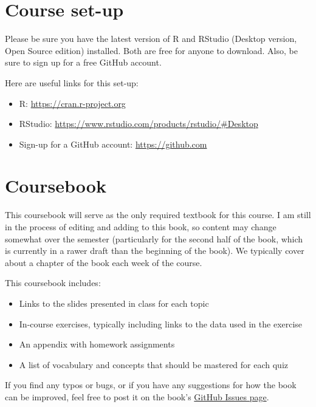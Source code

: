 \documentclass[]{book}
\providecommand{\tightlist}{%
  \setlength{\itemsep}{0pt}\setlength{\parskip}{0pt}}
\begin{document}
\hypertarget{course-set-up}{%
\section{Course set-up}\label{course-set-up}}

Please be sure you have the latest version of R and RStudio (Desktop version, Open Source edition) installed. Both are free for anyone to download. Also, be sure to sign up for a free GitHub account.

Here are useful links for this set-up:

\begin{itemize}
\tightlist
\item
  R: \url{https://cran.r-project.org}
\item
  RStudio: \url{https://www.rstudio.com/products/rstudio/\#Desktop}
\item
  Sign-up for a GitHub account: \url{https://github.com}
\end{itemize}

\hypertarget{coursebook}{%
\section{Coursebook}\label{coursebook}}

This coursebook will serve as the only required textbook for this course. I am still in the process of editing and adding to this book, so content may change somewhat over the semester (particularly for the second half of the book, which is currently in a rawer draft than the beginning of the book). We typically cover about a chapter of the book each week of the course.

This coursebook includes:

\begin{itemize}
\tightlist
\item
  Links to the slides presented in class for each topic
\item
  In-course exercises, typically including links to the data used in the exercise
\item
  An appendix with homework assignments
\item
  A list of vocabulary and concepts that should be mastered for each quiz
\end{itemize}

If you find any typos or bugs, or if you have any suggestions for how the book can be improved, feel free to post it on the book's \href{https://github.com/geanders/RProgrammingForResearch/issues}{GitHub Issues page}.
\end{document}
